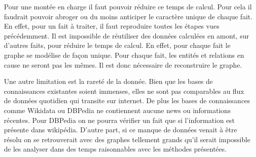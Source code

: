 Pour une montée en charge il faut pouvoir réduire ce temps de calcul. Pour cela il faudrait pouvoir abroger ou du moins anticiper le caractère unique de chaque fait. En effet, pour un fait à traiter, il faut reproduire toutes les étapes vues précédemment. Il est impossible de réutiliser des données calculées en amont, sur d'autres faits, pour réduire le temps de calcul. En effet, pour chaque fait le graphe se modélise de façon unique. Pour chaque fait, les entités et relations en cause ne seront pas les mêmes. Il est donc nécessaire de reconstruire le graphe.

Une autre limitation est la rareté de la donnée. Bien que les bases de connaissances existantes soient immenses, elles ne sont pas comparables au flux de données quotidien qui transite sur internet. De plus les bases de connaissances comme Wikidata ou DBPedia ne contiennent aucune news ou informations récentes. Pour DBPedia on ne pourra vérifier un fait que si l'information est présente dans wikipédia. D'autre part, si ce manque de données venait à être résolu on se retrouverait avec des graphes tellement grands qu'il serait impossible de les analyser dans des temps raisonnables avec les méthodes présentées.
